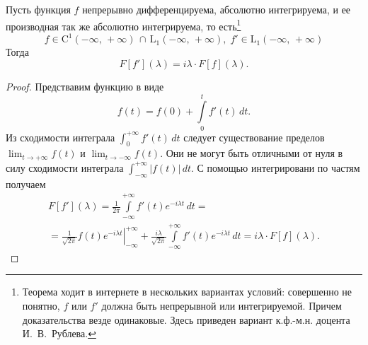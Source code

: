 \begin{theorem}
        Пусть функция $f$ непрерывно дифференцируема, абсолютно интегрируема, и ее производная так же абсолютно интегрируема, то есть\footnote{Теорема ходит в интернете в нескольких вариантах условий: совершенно не понятно, $f$ или $f'$ должна быть непрерывной или интегрируемой. Причем доказательства везде одинаковые. Здесь приведен вариант к.ф.-м.н. доцента И.~В.~Рублева.}
$$
        f \in \mathrm{C}^1(-\infty,\,+\infty)\,\cap\,\mathrm{L}_1(-\infty,\,+\infty),\;f' \in \mathrm{L}_1(-\infty,\,+\infty)
$$
        Тогда
$$
        F[f'](\lambda) = i\lambda \cdot F[f](\lambda).
$$
\end{theorem}
\begin{proof}
        Предствавим функцию в виде
$$
        f(t) = f(0) + \int\limits_{0}^{t} f'(t)\,dt.
$$
        Из сходимости интеграла $\int_0^{+\infty}f'(t)\,dt$ следует существование пределов $\lim_{t\to+\infty}f(t)$ и $\lim_{t\to-\infty}f(t)$. Они не могут быть отличными от нуля в силу сходимости интеграла $\int_{-\infty}^{+\infty}|f(t)|\,dt$. С помощью интегрировани по частям получаем
\begin{multline*}
        F[f'](\lambda) = \frac{1}{2\pi}\int\limits_{-\infty}^{+\infty}f'(t)e^{-i\lambda t}\,dt=\\
        =
        \left.\frac{1}{\sqrt{2\pi}}f(t)e^{-i\lambda t}\right|_{-\infty}^{+\infty}
        +
        \frac{i\lambda}{\sqrt{2\pi}}\int\limits_{-\infty}^{+\infty}f'(t)e^{-i\lambda t}\,dt
        = i\lambda\cdot F[f](\lambda).
\end{multline*}
\end{proof}
